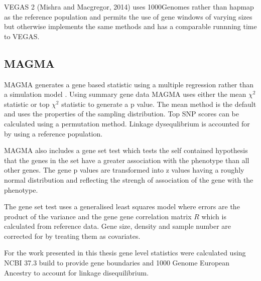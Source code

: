 VEGAS 2 (Mishra and Macgregor, 2014) uses 1000Genomes rather than hapmap as the reference population and permits the use of gene windows of varying sizes but otherwise implements the same methods and has a comparable runnning time to VEGAS.

\subsection{MAGMA}
\label{sec:MAGMA_gene_scores}
MAGMA generates a gene based statistic using a multiple regression rather than a simulation model \cite{de2015magma}. Using summary gene data MAGMA uses either the mean $\chi^2$ statistic or top $\chi^2$ statistic to generate a p value. The mean method is the default and uses the properties of the sampling distribution.\cite{brown1975400} Top SNP scores can be calculated using a permutation method.   Linkage dysequlibrium is accounted for by using a reference population. 
 
MAGMA also includes a gene set test which tests the self contained hypothesis that the genes in the set have a greater association with the phenotype than all other genes. The gene p values are transformed into z values having a roughly normal distribution and reflecting the strengh of association of the gene with the phenotype. 

The gene set test uses a generalised least squares model where errors are the product of the variance and the gene gene correlation matrix $R$ which is calculated from reference data. Gene size, density and sample number are corrected for by treating them as covariates.

For the work presented in this thesis gene level statistics were calculated using NCBI 37.3 build to provide gene boundaries and 1000 Genome European Ancestry to account for linkage disequilibrium. 

